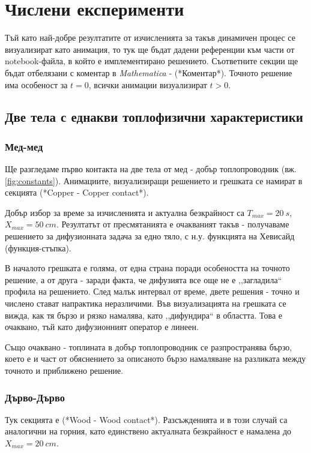 \section{Числени експерименти}
Тъй като най-добре резултатите от изчисленията за такъв динамичен процес се визуализират като анимация, то тук ще бъдат дадени референции към части от notebook-файла, в който е имплементирано решението.
Съответните секции ще бъдат отбелязани с коментар в \textit{Mathematica} - \textcolor{comment}{(*Коментар*)}.
Точното решение има особеност за $t = 0$, всички анимации визуализират $t>0$.
\subsection{Две тела с еднакви топлофизични характеристики}
\subsubsection{Мед-мед}
Ще разгледаме първо контакта на две тела от мед - добър топлопроводник (вж. \autoref{fig:constants}). Анимациите, визуализиращи решението и грешката се намират в секцията  \textcolor{comment}{(*Copper - Copper contact*)}.

Добър избор за време за изчисленията и актуална безкрайност са $T_{max} = 20~s$, $X_{max} = 50~cm$. Резултатът от пресмятанията е очакваният такъв - получаваме решението за дифузионната задача за едно тяло, с н.у. функцията на
Хевисайд (функция-стъпка).

В началото грешката е голяма, от една страна поради особеността на точното решение, а от друга - заради факта, че дифузията все още не е ,,загладила`` профила на решението. След малък интервал от време, двете решения - точно и числено стават напрактика неразличими. Във визуализацията на грешката
се вижда, как тя бързо и рязко намалява, като ,,дифундира`` в областта. Това е очаквано, тъй като дифузионният оператор е линеен.

Също очаквано - топлината в добър топлопроводник се разпространява бързо, което е и част от обяснението за описаното бързо намаляване на разликата между точното и приближено решение.

\subsubsection{Дърво-Дърво}
\label{sect:WoodWood}
Тук секцията е \textcolor{comment}{(*Wood - Wood contact*)}.
 Разсъжденията и в този случай са аналогични на горния, като единствено актуалната безкрайност е намалена до $X_{max}=20~cm$. 
 
